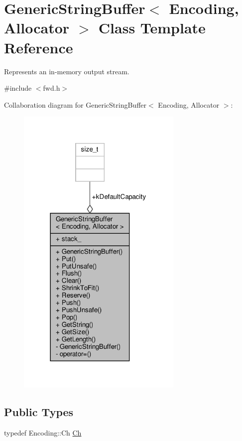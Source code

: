 \hypertarget{classGenericStringBuffer}{}\section{Generic\+String\+Buffer$<$ Encoding, Allocator $>$ Class Template Reference}
\label{classGenericStringBuffer}


Represents an in-\/memory output stream.  




{\ttfamily \#include $<$fwd.\+h$>$}



Collaboration diagram for Generic\+String\+Buffer$<$ Encoding, Allocator $>$\+:
\nopagebreak
\begin{figure}[H]
\begin{center}
\leavevmode
\includegraphics[width=225pt]{classGenericStringBuffer__coll__graph}
\end{center}
\end{figure}
\subsection*{Public Types}
\begin{DoxyCompactItemize}
\item 
typedef Encoding\+::\+Ch \hyperlink{classGenericStringBuffer_a735b75db076ffe86d0d294be49655d46}{Ch}
\end{DoxyCompactItemize}
